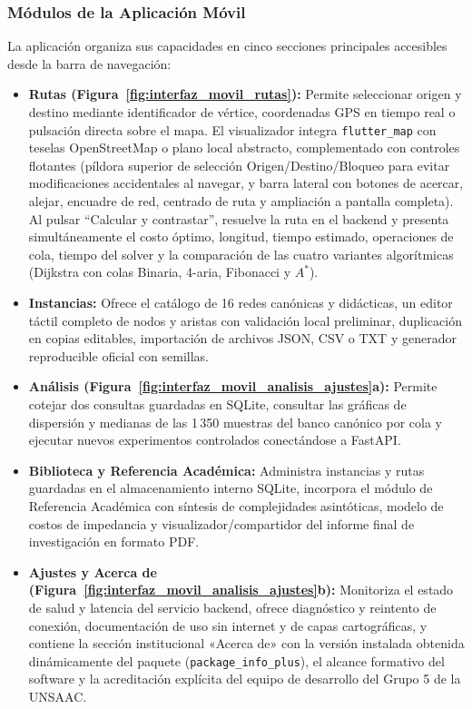 \subsubsection{Módulos de la Aplicación Móvil}
La aplicación organiza sus capacidades en cinco secciones principales accesibles desde la barra de navegación:
\begin{itemize}
    \item \textbf{Rutas (Figura~\ref{fig:interfaz_movil_rutas}):} Permite seleccionar origen y destino mediante identificador de vértice, coordenadas GPS en tiempo real o pulsación directa sobre el mapa. El visualizador integra \texttt{flutter\_map} con teselas OpenStreetMap o plano local abstracto, complementado con controles flotantes (píldora superior de selección Origen/Destino/Bloqueo para evitar modificaciones accidentales al navegar, y barra lateral con botones de acercar, alejar, encuadre de red, centrado de ruta y ampliación a pantalla completa). Al pulsar \enquote{Calcular y contrastar}, resuelve la ruta en el backend y presenta simultáneamente el costo óptimo, longitud, tiempo estimado, operaciones de cola, tiempo del solver y la comparación de las cuatro variantes algorítmicas (Dijkstra con colas Binaria, 4-aria, Fibonacci y $A^*$).
    \item \textbf{Instancias:} Ofrece el catálogo de 16 redes canónicas y didácticas, un editor táctil completo de nodos y aristas con validación local preliminar, duplicación en copias editables, importación de archivos JSON, CSV o TXT y generador reproducible oficial con semillas.
    \item \textbf{Análisis (Figura~\ref{fig:interfaz_movil_analisis_ajustes}a):} Permite cotejar dos consultas guardadas en SQLite, consultar las gráficas de dispersión y medianas de las 1\,350 muestras del banco canónico por cola y ejecutar nuevos experimentos controlados conectándose a FastAPI.
    \item \textbf{Biblioteca y Referencia Académica:} Administra instancias y rutas guardadas en el almacenamiento interno SQLite, incorpora el módulo de Referencia Académica con síntesis de complejidades asintóticas, modelo de costos de impedancia y visualizador/compartidor del informe final de investigación en formato PDF.
    \item \textbf{Ajustes y Acerca de (Figura~\ref{fig:interfaz_movil_analisis_ajustes}b):} Monitoriza el estado de salud y latencia del servicio backend, ofrece diagnóstico y reintento de conexión, documentación de uso sin internet y de capas cartográficas, y contiene la sección institucional «Acerca de» con la versión instalada obtenida dinámicamente del paquete (\texttt{package\_info\_plus}), el alcance formativo del software y la acreditación explícita del equipo de desarrollo del Grupo 5 de la UNSAAC.
\end{itemize}

